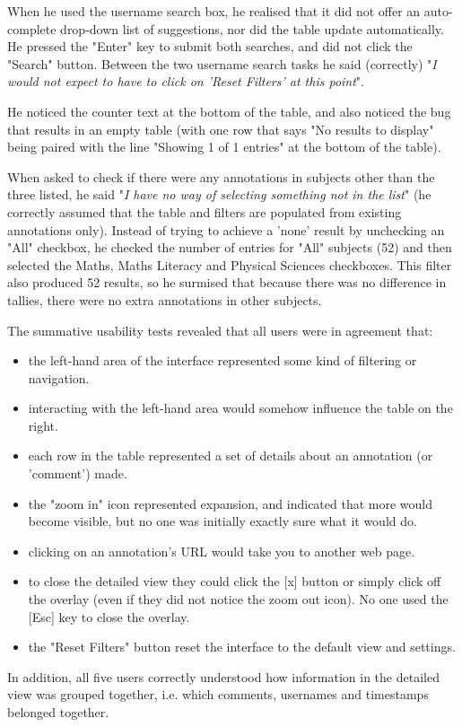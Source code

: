 When he used the username search box, he realised that it did not offer an auto-complete drop-down list of suggestions, nor did the table update automatically. He pressed the "Enter" key to submit both searches, and did not click the "Search" button. Between the two username search tasks he said (correctly) "\textit{I would not expect to have to click on 'Reset Filters' at this point}".

He noticed the counter text at the bottom of the table, and also noticed the bug that results in an empty table (with one row that says "No results to display" being paired with the line "Showing 1 of 1 entries" at the bottom of the table). 

When asked to check if there were any annotations in subjects other than the three listed, he said "\textit{I have no way of selecting something not in the list}" (he correctly assumed that the table and filters are populated from existing annotations only). Instead of trying to achieve a 'none' result by unchecking an "All" checkbox, he checked the number of entries for "All" subjects (52) and then selected the Maths, Maths Literacy and Physical Sciences checkboxes. This filter also produced 52 results, so he surmised that because there was no difference in tallies, there were no extra annotations in other subjects.

The summative usability tests revealed that all users were in agreement that:
\begin{itemize}
 \item the left-hand area of the interface represented some kind of filtering or navigation.
\item interacting with the left-hand area would somehow influence the table on the right.
\item each row in the table represented a set of  details about an annotation (or 'comment') made.
\item the "zoom in" icon represented expansion, and indicated that more would become visible, but no one was initially exactly sure what it would do.
\item clicking on an annotation's URL would take you to another web page.
\item to close the detailed view they could click the [x] button or simply click off the overlay (even if they did not notice the zoom out icon). No one used the [Esc] key to close the overlay. 
\item the "Reset Filters" button reset the interface to the default view and settings.
\end{itemize}
In addition, all five users correctly understood how information in the detailed view was grouped together, i.e. which comments, usernames and timestamps belonged together. 

